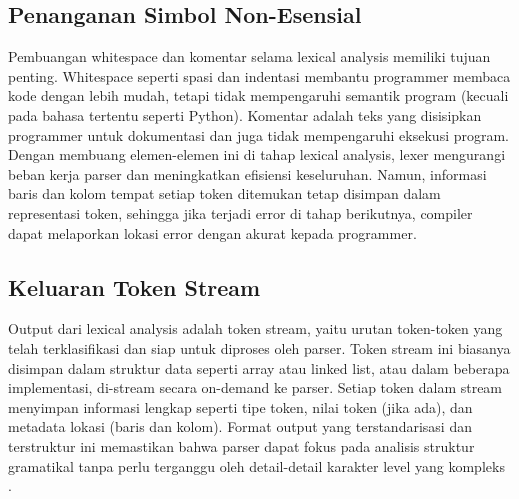 \subsection{Penanganan Simbol Non-Esensial}

Pembuangan whitespace dan komentar selama lexical analysis memiliki tujuan penting. Whitespace seperti spasi dan indentasi membantu programmer membaca kode dengan lebih mudah, tetapi tidak mempengaruhi semantik program (kecuali pada bahasa tertentu seperti Python). Komentar adalah teks yang disisipkan programmer untuk dokumentasi dan juga tidak mempengaruhi eksekusi program. Dengan membuang elemen-elemen ini di tahap lexical analysis, lexer mengurangi beban kerja parser dan meningkatkan efisiensi keseluruhan. Namun, informasi baris dan kolom tempat setiap token ditemukan tetap disimpan dalam representasi token, sehingga jika terjadi error di tahap berikutnya, compiler dapat melaporkan lokasi error dengan akurat kepada programmer.

\subsection{Keluaran Token Stream}

Output dari lexical analysis adalah token stream, yaitu urutan token-token yang telah terklasifikasi dan siap untuk diproses oleh parser. Token stream ini biasanya disimpan dalam struktur data seperti array atau linked list, atau dalam beberapa implementasi, di-stream secara on-demand ke parser. Setiap token dalam stream menyimpan informasi lengkap seperti tipe token, nilai token (jika ada), dan metadata lokasi (baris dan kolom). Format output yang terstandarisasi dan terstruktur ini memastikan bahwa parser dapat fokus pada analisis struktur gramatikal tanpa perlu terganggu oleh detail-detail karakter level yang kompleks \cite{aho2007compilers,grune2012modern}.